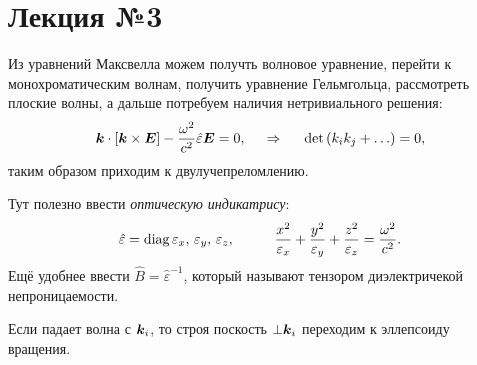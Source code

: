 \section*{Лекция №3}



Из уравнений Максвелла можем получть волновое уравнение, перейти к монохроматическим волнам, получить уравнение Гельмгольца, рассмотреть плоские волны, а дальше потребуем наличия нетривиального решения:
\begin{equation*}
    \mbox{\boldmath $k$} \cdot [\mbox{\boldmath $k$} \times  \mbox{\boldmath $E$}] - \frac{\omega^2}{c^2} \hat{\varepsilon} \mbox{\boldmath $E$} = 0,
    \hspace{0.5cm} \Rightarrow \hspace{0.5cm}
    \det\left(
        k_i k_j + \ldots
    \right) = 0,
\end{equation*}
таким образом приходим к двулучепреломлению.

Тут полезно ввести \textit{оптическую индикатрису}:
\begin{equation*}
    \hat{\varepsilon} = \diag{\varepsilon_x,\, \varepsilon_y,\, \varepsilon_z},
    \hspace{10 mm} 
    \frac{x^2}{\varepsilon_x} + \frac{y^2}{\varepsilon_y} + \frac{z^2}{\varepsilon_z} = \frac{\omega^2}{c^2}.
\end{equation*}
Ещё удобнее ввести $\hat{B} = \hat{\varepsilon}^{-1}$, который называют тензором диэлектричекой непроницаемости.


Если падает волна с $\mbox{\boldmath $k$}_i$, то строя поскость $\bot \mbox{\boldmath $k$}_i$ переходим к эллепсоиду вращения.




